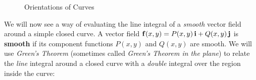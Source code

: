 \begin{figure}[h]
{\begin{tikzpicture}
 \end{tikzpicture}}
 \qquad\qquad
 \qquad\qquad
 \caption[]{\quad Orientations of Curves}
 \label{fig:multconn}
\end{figure}  

We will now see a way of evaluating the line integral of a \emph{smooth} vector field
around a simple closed curve. 
A vector field $\vector{f}(x,y) = P(x,y)\,\vector{i} + Q(x,y)\,\vector{j}$ is \textbf{smooth} if its
component functions $P(x,y)$ and $Q(x,y)$ are smooth.
We will use
\emph{Green's Theorem} (sometimes called \emph{Green's Theorem in the plane}) to relate the \emph{line} integral around
a closed curve with a \emph{double} integral over the region inside the curve:


